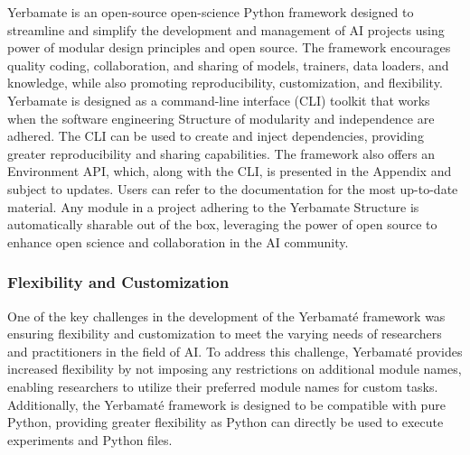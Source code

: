 Yerbamate is an open-source open-science Python framework designed to streamline and simplify the development and management of AI projects using power of modular design principles and open source. The framework encourages quality coding, collaboration, and sharing of models, trainers, data loaders, and knowledge, while also promoting reproducibility, customization, and flexibility. 
Yerbamate is designed as a command-line interface (CLI) toolkit that works when the software engineering Structure of modularity and independence are adhered. The CLI can be used to create and inject dependencies, providing greater reproducibility and sharing capabilities. 
The framework also offers an Environment API, which, along with the CLI, is presented in the Appendix and subject to updates. Users can refer to the documentation for the most up-to-date material. Any module in a project adhering to the Yerbamate Structure is automatically sharable out of the box, leveraging the power of open source to enhance open science and collaboration in the AI community.

\subsubsection{Flexibility and Customization}

One of the key challenges in the development of the Yerbamaté framework was ensuring flexibility and customization to meet the varying needs of researchers and practitioners in the field of AI. To address this challenge, Yerbamaté provides increased flexibility by not imposing any restrictions on additional module names, enabling researchers to utilize their preferred module names for custom tasks. 
Additionally, the Yerbamaté framework is designed to be compatible with pure Python, providing greater flexibility as Python can directly be used to execute experiments and Python files.


